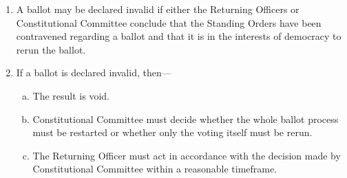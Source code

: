 \documentclass[12pt]{article}  %
\begin{document}
\begin{enumerate}
    \item A ballot may be declared invalid if either the Returning Officers or Constitutional Committee conclude that the Standing Orders have been contravened regarding a ballot and that it is in the interests of democracy to rerun the ballot.
    \item If a ballot is declared invalid, then—
    \begin{enumerate}[(a)]
        \item The result is void.
        \item Constitutional Committee must decide whether the whole ballot process must be restarted or whether only the voting itself must be rerun.
        \item The Returning Officer must act in accordance with the decision made by Constitutional Committee within a reasonable timeframe.
    \end{enumerate}
\end{enumerate}
\newpage
\end{document}
